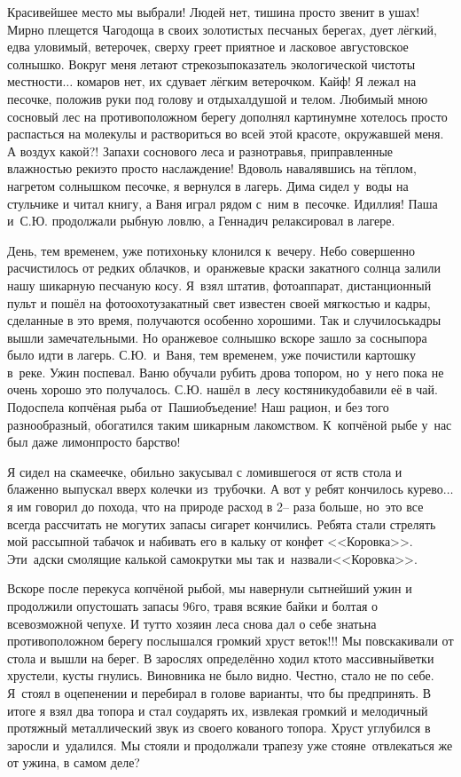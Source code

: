 Красивейшее место мы выбрали! Людей нет, тишина просто звенит в ушах! Мирно плещется Чагодоща в своих золотистых песчаных берегах, дует лёгкий, едва уловимый, ветерочек, сверху греет приятное и ласковое августовское солнышко. Вокруг меня летают стрекозы\mdash показатель экологической чистоты местности$\ldots$ комаров нет, их сдувает лёгким ветерочком. Кайф! Я лежал на песочке, положив руки под голову и отдыхал\mdash душой и телом. Любимый мною сосновый лес на противоположном берегу дополнял картину\mdash мне хотелось просто распасться на молекулы и раствориться во всей этой красоте, окружавшей меня. А воздух какой?! Запахи соснового леса и разнотравья, приправленные влажностью реки\mdash это просто наслаждение! Вдоволь навалявшись на тёплом, нагретом солнышком песочке, я вернулся в лагерь. Дима сидел у~воды на стульчике и читал книгу, а Ваня играл рядом с~ним в~песочке. Идиллия! Паша и~С.Ю. продолжали рыбную ловлю, а Геннадич релаксировал в лагере.

День, тем временем, уже потихоньку клонился к~вечеру. Небо совершенно расчистилось от редких облачков, и~оранжевые краски закатного солнца залили нашу шикарную песчаную косу. Я~взял штатив, фотоаппарат, дистанционный пульт и пошёл на фотоохоту\mdash закатный свет известен своей мягкостью и кадры, сделанные в это время, получаются особенно хорошими. Так и случилось\mdash кадры вышли замечательными. Но оранжевое солнышко вскоре зашло за сосны\mdash пора было идти в лагерь. С.Ю.~и~Ваня, тем временем, уже почистили картошку в~реке. Ужин поспевал. Ваню обучали рубить дрова топором, но~у него пока не очень хорошо это получалось. С.Ю. нашёл в~лесу костянику\mdash добавили её в чай. Подоспела копчёная рыба от~Паши\mdash объедение! Наш рацион, и без того разнообразный, обогатился таким шикарным лакомством. К~копчёной рыбе у~нас был даже лимон\mdash просто барство! 

Я сидел на скамеечке, обильно закусывал с ломившегося от яств стола и блаженно выпускал вверх колечки из~трубочки. А вот у ребят кончилось курево$\ldots$ я им говорил до похода, что на природе расход в 2\thinspace\nobreakdash-- раза больше, но~это все всегда рассчитать не могут\mdash их запасы сигарет кончились. Ребята стали стрелять мой рассыпной табачок и набивать его в кальку от конфет <<Коровка>>. Эти~адски смолящие калькой самокрутки мы так и~назвали\mdash <<Коровка>>. 

Вскоре после перекуса копчёной рыбой, мы навернули сытнейший ужин и продолжили опустошать запасы 96\sdash го, травя всякие байки и болтая о всевозможной чепухе. И тут\sdash то хозяин леса снова дал о себе знать\mdash на противоположном берегу послышался громкий хруст веток!!! Мы повскакивали от стола и вышли на берег. В зарослях определённо ходил кто\sdash то массивный\mdash ветки хрустели, кусты гнулись. Виновника не было видно. Честно, стало не по себе. Я~стоял в оцепенении и перебирал в голове варианты, что бы предпринять. В итоге я взял два топора и стал соударять их, извлекая громкий и мелодичный протяжный металлический звук из своего кованого топора. Хруст углубился в заросли и~удалился. Мы стояли и продолжали трапезу уже стоя\mdash не~отвлекаться же от ужина, в самом деле?

